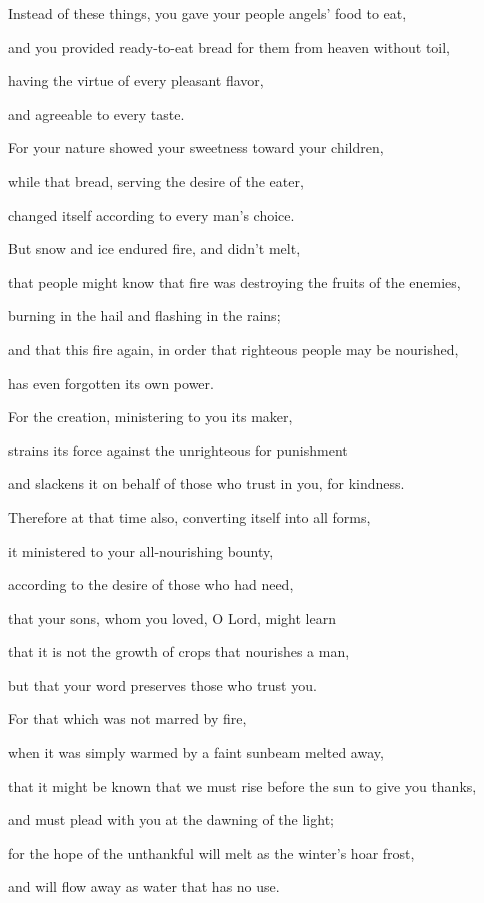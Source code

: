 {\par }{\Q {}Instead of these things, you gave your people angels’ food to eat,
\par }{\QB and you provided ready-to-eat bread for them from heaven without toil,
\par }{\QB having the virtue of every pleasant flavor,
\par }{\QB and agreeable to every taste.
\par }{\Q {}For your nature showed your sweetness toward your children,
\par }{\QB while that bread, serving the desire of the eater,
\par }{\QB changed itself according to every man’s choice.
\par }{\Q {}But snow and ice endured fire, and didn’t melt,
\par }{\QB that people might know that fire was destroying the fruits of the enemies,
\par }{\QB burning in the hail and flashing in the rains;
\par }{\Q {}and that this fire again, in order that righteous people may be nourished,
\par }{\QB has even forgotten its own power.
\par }{\Q {}For the creation, ministering to you its maker,
\par }{\QB strains its force against the unrighteous for punishment
\par }{\QB and slackens it on behalf of those who trust in you, for kindness.
\par }{\Q {}Therefore at that time also, converting itself into all forms,
\par }{\QB it ministered to your all-nourishing bounty,
\par }{\QB according to the desire of those who had need,
\par }{\Q {}that your sons, whom you loved, O Lord, might learn
\par }{\QB that it is not the growth of crops that nourishes a man,
\par }{\QB but that your word preserves those who trust you.
\par }{\Q {}For that which was not marred by fire,
\par }{\QB when it was simply warmed by a faint sunbeam melted away,
\par }{\Q {}that it might be known that we must rise before the sun to give you thanks,
\par }{\QB and must plead with you at the dawning of the light;
\par }{\Q {}for the hope of the unthankful will melt as the winter’s hoar frost,
\par }{\QB and will flow away as water that has no use.
\par }{\BB \par }
